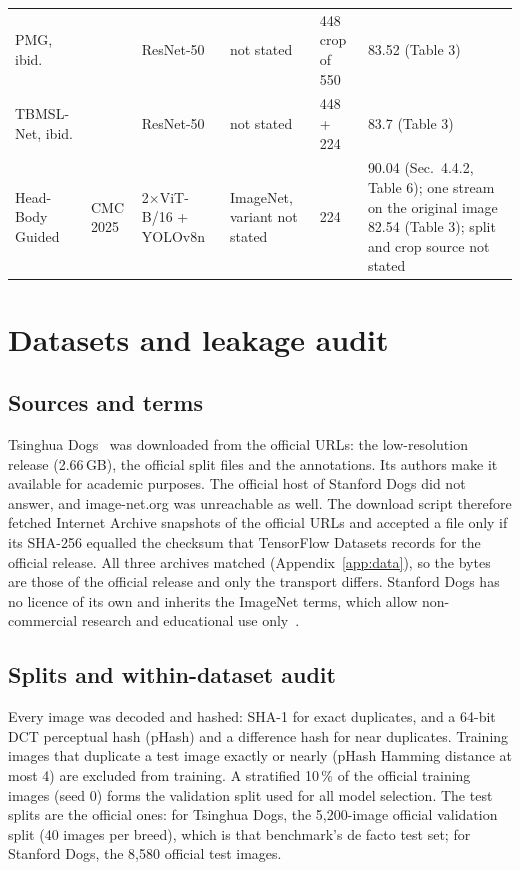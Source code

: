 \documentclass[11pt,a4paper]{article}
\theoremstyle{plain}
\begin{document}
\begin{table}[!htbp]
\begin{tabularx}{\textwidth}{@{}L{2.3cm}L{1.45cm}L{2.0cm}L{1.6cm}L{1.45cm}Y@{}}
\quad PMG, ibid. & & ResNet-50 & not stated & 448 crop of 550 & 83.52 (Table 3)\\
\quad TBMSL-Net, ibid. & & ResNet-50 & not stated & 448 + 224 & 83.7 (Table 3)\\
Head-Body Guided~\citep{khan2025headbody} & CMC 2025 & 2$\times$ViT-B/16 + YOLOv8n & ImageNet, variant not stated & 224 & 90.04 (Sec.~4.4.2, Table 6); one stream on the original image 82.54 (Table 3); split and crop source not stated\\
\bottomrule
\end{tabularx}
\end{table}

\section{Datasets and leakage audit}\label{sec:data}

\subsection{Sources and terms}\label{sec:data-sources}
Tsinghua Dogs~\citep{zou2020tsinghuadogs} was downloaded from the official URLs: the low-resolution release
(2.66\,GB), the official split files and the annotations. Its authors make it available for academic purposes. The
official host of Stanford Dogs did not answer, and image-net.org was unreachable as well. The download script
therefore fetched Internet Archive snapshots of the official URLs and accepted a file only if its SHA-256 equalled the
checksum that TensorFlow Datasets records for the official release. All three archives matched
(Appendix~\ref{app:data}), so the bytes are those of the official release and only the transport differs. Stanford
Dogs has no licence of its own and inherits the ImageNet terms, which allow non-commercial research and educational
use only~\citep{khosla2011stanforddogs,deng2009imagenet}.

\subsection{Splits and within-dataset audit}\label{sec:data-splits}
Every image was decoded and hashed: SHA-1 for exact duplicates, and a 64-bit DCT perceptual hash (pHash) and a
difference hash for near duplicates. Training images that duplicate a test image exactly or nearly (pHash Hamming
distance at most 4) are excluded from training. A stratified 10\,\% of the official training images (seed 0) forms
the validation split used for all model selection. The test splits are the official ones: for Tsinghua Dogs, the
5,200-image official validation split (40 images per breed), which is that benchmark's de facto test set; for
Stanford Dogs, the 8,580 official test images.
\end{document}
